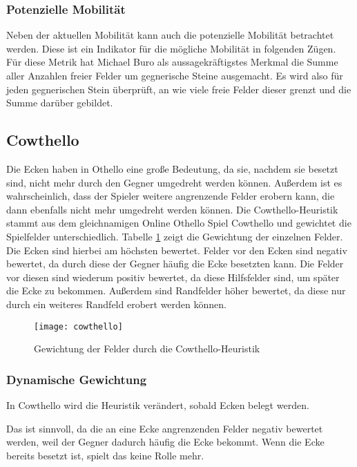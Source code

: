 \subsubsection{Potenzielle Mobilität}
\label{sec:potmobility}
Neben der aktuellen Mobilität kann auch die potenzielle Mobilität betrachtet werden. Diese ist ein Indikator für die
mögliche Mobilität in folgenden Zügen. Für diese Metrik hat Michael Buro als aussagekräftigstes Merkmal die Summe aller Anzahlen freier
Felder um gegnerische Steine ausgemacht. Es wird also für jeden gegnerischen Stein überprüft, an wie viele freie Felder
dieser grenzt und die Summe darüber gebildet.
\cite[S.~8f.]{evaluationfunctions}

\subsection{Cowthello}
\label{sec:cowthello}
Die Ecken haben in Othello eine große Bedeutung, da sie, nachdem sie besetzt sind, nicht mehr durch den Gegner umgedreht werden können. Außerdem
ist es wahrscheinlich, dass der Spieler weitere angrenzende Felder erobern kann, die dann ebenfalls nicht mehr umgedreht
werden können. Die Cowthello-Heuristik stammt aus dem gleichnamigen Online Othello Spiel Cowthello und gewichtet die Spielfelder
unterschiedlich.
\cite{cowthello}
Tabelle \ref{fig:cowthello} zeigt die Gewichtung der einzelnen Felder. Die Ecken sind hierbei am höchsten bewertet. Felder vor
den Ecken sind negativ bewertet, da durch diese der Gegner häufig die Ecke besetzten kann. Die Felder vor diesen sind wiederum
positiv bewertet, da diese Hilfsfelder sind, um später die Ecke zu bekommen. Außerdem sind Randfelder höher bewertet, da
diese nur durch ein weiteres Randfeld erobert werden können.

\begin{figure}[H]
    \centering
    \texttt{[image: cowthello]}
    \caption{Gewichtung der Felder durch die Cowthello-Heuristik}
    \label{fig:cowthello}
\end{figure}

\subsubsection{Dynamische Gewichtung}
In Cowthello wird die Heuristik verändert, sobald Ecken belegt werden.
\cite{cowthello}

Das ist sinnvoll, da die an eine Ecke angrenzenden Felder negativ bewertet werden, weil der Gegner dadurch häufig die
Ecke bekommt. Wenn die Ecke bereits besetzt ist, spielt das keine Rolle mehr.
